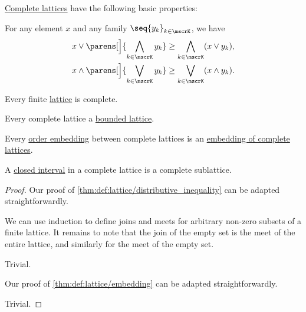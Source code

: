 \begin{proposition}\label{thm:def:complete_lattice}
  \hyperref[def:complete_lattice]{Complete lattices} have the following basic properties:
  \begin{thmenum}
     For any element \( x \) and any family \( \seq{ y_k }_{k \in \mscrK} \), we have
    \begin{align}
      x \vee \parens[\Big]{ \bigwedge_{k \in \mscrK} y_k } &\geq \bigwedge_{k \in \mscrK} (x \vee y_k), \label{eq:thm:def:complete_lattice/distributive_inequality/join_over_meet} \\
      x \wedge \parens[\Big]{ \bigvee_{k \in \mscrK} y_k } &\geq \bigvee_{k \in \mscrK} (x \wedge y_k). \label{eq:thm:def:complete_lattice/distributive_inequality/meet_over_join}
    \end{align}

     Every finite \hyperref[def:lattice]{lattice} is complete.

     Every complete lattice a \hyperref[def:bounded_lattice]{bounded lattice}.

     Every \hyperref[def:preordered_set/homomorphism]{order embedding} between complete lattices is an \hyperref[def:lattice/homomorphism]{embedding of complete lattices}.

     A \hyperref[def:order_interval/closed]{closed interval} in a complete lattice is a complete sublattice.
  \end{thmenum}
\end{proposition}
\begin{proof}
   Our proof of \cref{thm:def:lattice/distributive_inequality} can be adapted straightforwardly.

   We can use induction to define joins and meets for arbitrary non-zero subsets of a finite lattice. It remains to note that the join of the empty set is the meet of the entire lattice, and similarly for the meet of the empty set.

   Trivial.

   Our proof of \cref{thm:def:lattice/embedding} can be adapted straightforwardly.

   Trivial.
\end{proof}

